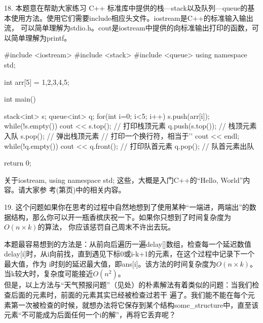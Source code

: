 \begin{exerciseanswer}
    \vspace{\baselineskip}

    18. 本题意在帮助大家练习 C++ 标准库中提供的栈---stack以及队列---queue的基本使用方法。使用它们需要include相应头文件。iostream是C++的标准输入输出流，
    可以简单理解为stdio.h。cout是iostream中提供的向标准输出打印的函数，可以简单理解为printf。
    \begin{cppcode}
        #include <iostream> 
        #include <stack>
        #include <queue>
        using namespace std;
        
        int arr[5] = {1,2,3,4,5};

        int main() {
            stack<int> s;
            queue<int> q;
            for(int i=0; i<5; i++) {
                s.push(arr[i]);
            }
            while(!s.empty()) {
                cout << s.top();    // 打印栈顶元素
                q.push(s.top());    // 栈顶元素入队
                s.pop();    // 弹出栈顶元素
            }
            // 打印一个换行符，相当于'\n'
            cout << endl;
            while(!q.empty()) {
                cout << q.front();  // 打印队首元素
                q.pop();    // 队首元素出队
            }

            return 0;
        }

    \end{cppcode}
    关于iostream, using namespace std; 这些，大概是入门C++的“Hello, World”内容。请大家参
    考(第\pageref{sec:cpp-hello-world}页)中的相关内容。

    \vspace{\baselineskip}

    19. 这个问题如果你在思考的过程中自然地想到了使用某种“一端进，两端出”的数据结构，那么你可以开一瓶香槟庆祝一下。如果你只想到了时间复杂度为\(O(n\times k)\)的算法，
    你应该惩罚自己周末不许出去玩。

    本题最容易想到的方法是：从前向后遍历一遍delay[]数组，检查每一个延迟数值delay[i]时，从i向前找，直到遇见下标0或i-k+1的元素，在这个过程中记录下一个最大值，作为
    i时刻的延迟最大值，即ans[i]。该方法的时间复杂度为\(O(n\times k)\)。当k较大时，复杂度可能接近\(O(n^2)\)。\\

    但是，以上方法与“天气预报问题”（见处）的朴素解法有着类似的问题：当我们检查后面的元素时，前面的元素其实已经被检查过若干
    遍了。我们能不能在每个元素第一次被检查的时候，就想办法将它保存到某个结构some\_structure中，直至该元素“不可能成为后面任何一个i的解”，再将它丢弃呢？\\


\end{exerciseanswer}
